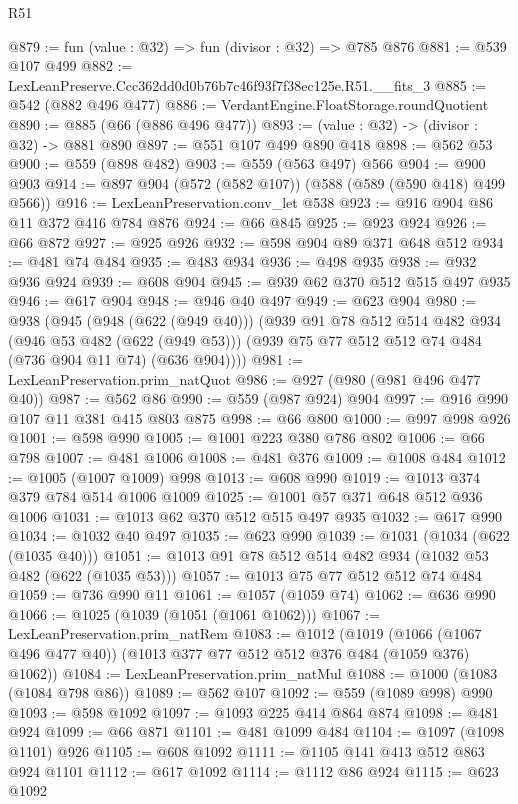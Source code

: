 \begin{lexlean}{R51}
\begin{coremodule}
@879 := fun (value : @32) => fun (divisor : @32) => @785 @876
@881 := @539 @107 @499
@882 := LexLeanPreserve.Ccc362dd0d0b76b7c46f93f7f38ec125e.R51.__fits_3
@885 := @542 (@882 @496 @477)
@886 := VerdantEngine.FloatStorage.roundQuotient
@890 := @885 (@66 (@886 @496 @477))
@893 := (value : @32) -> (divisor : @32) -> @881 @890
@897 := @551 @107 @499 @890 @418
@898 := @562 @53
@900 := @559 (@898 @482)
@903 := @559 (@563 @497) @566
@904 := @900 @903
@914 := @897 @904 (@572 (@582 @107)) (@588 (@589 (@590 @418) @499 @566))
@916 := LexLeanPreservation.conv_let @538
@923 := @916 @904 @86 @11 @372 @416 @784 @876
@924 := @66 @845
@925 := @923 @924
@926 := @66 @872
@927 := @925 @926
@932 := @598 @904 @89 @371 @648 @512
@934 := @481 @74 @484
@935 := @483 @934
@936 := @498 @935
@938 := @932 @936 @924
@939 := @608 @904
@945 := @939 @62 @370 @512 @515 @497 @935
@946 := @617 @904
@948 := @946 @40 @497
@949 := @623 @904
@980 := @938
    (@945
      (@948 (@622 (@949 @40)))
      (@939
        @91
        @78
        @512
        @514
        @482
        @934
        (@946 @53 @482 (@622 (@949 @53)))
        (@939 @75 @77 @512 @512 @74 @484 (@736 @904 @11 @74) (@636 @904))))
@981 := LexLeanPreservation.prim_natQuot
@986 := @927 (@980 (@981 @496 @477 @40))
@987 := @562 @86
@990 := @559 (@987 @924) @904
@997 := @916 @990 @107 @11 @381 @415 @803 @875
@998 := @66 @800
@1000 := @997 @998 @926
@1001 := @598 @990
@1005 := @1001 @223 @380 @786 @802
@1006 := @66 @798
@1007 := @481 @1006
@1008 := @481 @376
@1009 := @1008 @484
@1012 := @1005 (@1007 @1009) @998
@1013 := @608 @990
@1019 := @1013 @374 @379 @784 @514 @1006 @1009
@1025 := @1001 @57 @371 @648 @512 @936 @1006
@1031 := @1013 @62 @370 @512 @515 @497 @935
@1032 := @617 @990
@1034 := @1032 @40 @497
@1035 := @623 @990
@1039 := @1031 (@1034 (@622 (@1035 @40)))
@1051 := @1013 @91 @78 @512 @514 @482 @934 (@1032 @53 @482 (@622 (@1035 @53)))
@1057 := @1013 @75 @77 @512 @512 @74 @484
@1059 := @736 @990 @11
@1061 := @1057 (@1059 @74)
@1062 := @636 @990
@1066 := @1025 (@1039 (@1051 (@1061 @1062)))
@1067 := LexLeanPreservation.prim_natRem
@1083 := @1012
    (@1019 (@1066 (@1067 @496 @477 @40)) (@1013 @377 @77 @512 @512 @376 @484 (@1059 @376) @1062))
@1084 := LexLeanPreservation.prim_natMul
@1088 := @1000 (@1083 (@1084 @798 @86))
@1089 := @562 @107
@1092 := @559 (@1089 @998) @990
@1093 := @598 @1092
@1097 := @1093 @225 @414 @864 @874
@1098 := @481 @924
@1099 := @66 @871
@1101 := @481 @1099 @484
@1104 := @1097 (@1098 @1101) @926
@1105 := @608 @1092
@1111 := @1105 @141 @413 @512 @863 @924 @1101
@1112 := @617 @1092
@1114 := @1112 @86 @924
@1115 := @623 @1092

\end{coremodule}
\end{lexlean}
